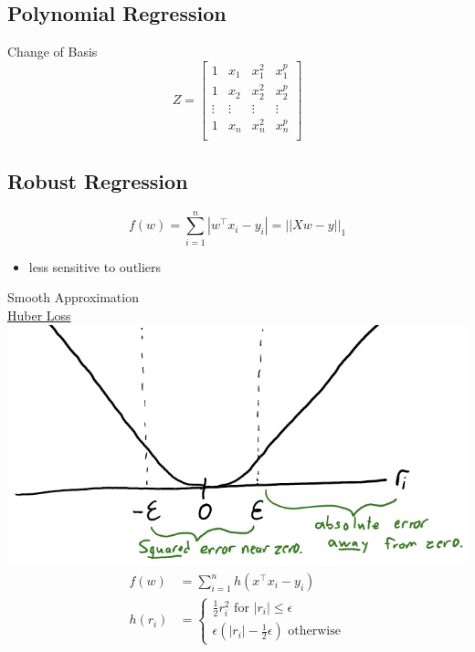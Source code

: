 \documentclass[10pt,landscape,a4paper]{article}
\begin{document}
\begin{multicols*}{5}
\subsection{Polynomial Regression}
Change of Basis
\begin{dmath*}
    Z =
    \begin{bmatrix}
        1 & x_1 & x_1^2 & x_1^p \\
        1 & x_2 & x_2^2 & x_2^p \\
        \vdots & \vdots & \vdots & \vdots \\
        1 & x_n & x_n^2 & x_n^p \\
    \end{bmatrix}
\end{dmath*}

\subsection{Robust Regression}
\begin{dmath*}
    f(w) = \sum_{i=1}^{n} |w^\intercal x_i - y_i| = ||Xw - y||_1
\end{dmath*}
\begin{itemize}
    \item less sensitive to outliers
\end{itemize}
Smooth Approximation \\
\underline{Huber Loss} \\
\includegraphics[scale=0.2]{huber_loss}
\begin{align*}
    f(w) &= \sum_{i=1}^{n} h(x^\intercal x_i - y_i) \\
    h(r_i) &=
    \begin{cases}
        \frac{1}{2}r_i^2 \text{ for \(|r_i| \leq \epsilon \)}\\
        \epsilon (|r_i|-\frac{1}{2} \epsilon) \text{ otherwise}
    \end{cases}
\end{align*}


\end{multicols*}
\end{document}
